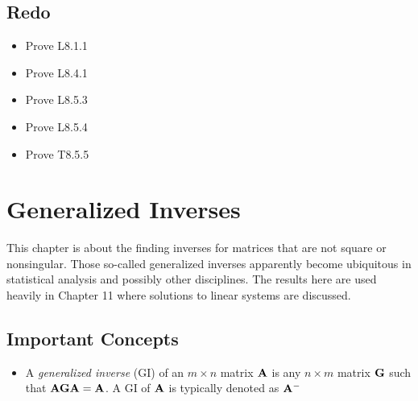 \documentclass[a4paper, oneside]{book}
\begin{document}
\section*{Redo}
\begin{itemize}
\item Prove L8.1.1
\item Prove L8.4.1
\item Prove L8.5.3
\item Prove L8.5.4
\item Prove T8.5.5
\end{itemize}








\chapter{Generalized Inverses}

This chapter is about the finding inverses for matrices that are not square or nonsingular. Those so-called generalized inverses apparently become ubiquitous in statistical analysis and possibly other disciplines. The results here are used heavily in Chapter 11 where solutions to linear systems are discussed.


\section*{Important Concepts}
\begin{itemize}
\item A \textit{generalized inverse} (GI) of an $m\times n$ matrix $\mathbf A$ is any $n\times m$ matrix $\mathbf G$ such that $\mathbf{AGA=A}$. A GI of $\mathbf A$ is typically denoted as $\mathbf A^-$
\end{itemize}
\end{document}

